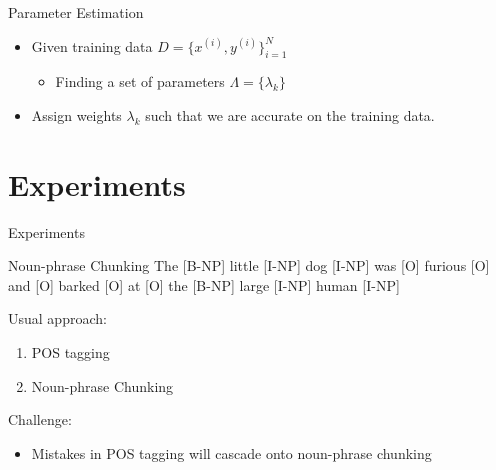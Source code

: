 \documentclass[presentation,bigger]{beamer}
\begin{document}
\begin{frame}[label={sec:orgheadline19}]{Parameter Estimation}
\begin{itemize}
\item Given training data \(D = \{x^{(i)},y^{(i)}\}^N_{i=1}\)
\begin{itemize}
\item Finding a set of parameters \(\Lambda = \{\lambda_k\}\)
\end{itemize}
\item Assign weights \(\lambda_k\) such that we are accurate on the training data.
\end{itemize}
\end{frame}
\section{Experiments}
\label{sec:orgheadline26}
\begin{frame}[label={sec:orgheadline21}]{Experiments}
\begin{block}{Noun-phrase Chunking}
The \alert{[B-NP]} little \alert{[I-NP]} dog \alert{[I-NP]} was \alert{[O]} furious \alert{[O]} and \alert{[O]} barked \alert{[O]} at \alert{[O]} the \alert{[B-NP]} large \alert{[I-NP]} human \alert{[I-NP]}
\end{block}
\begin{block}{Usual approach:}
\begin{enumerate}
\item POS tagging
\item Noun-phrase Chunking
\end{enumerate}
\end{block}
\begin{block}{Challenge:}
\begin{itemize}
\item Mistakes in POS tagging will cascade onto noun-phrase chunking
\end{itemize}
\end{block}
\end{frame}
\end{document}
